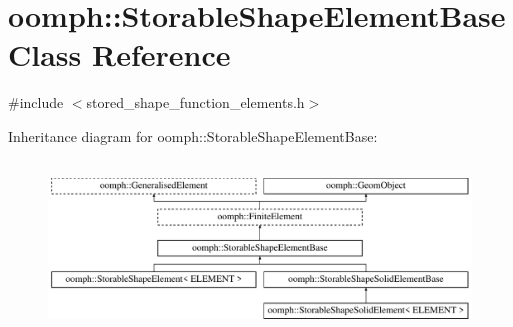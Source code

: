 \hypertarget{classoomph_1_1StorableShapeElementBase}{}\section{oomph\+:\+:Storable\+Shape\+Element\+Base Class Reference}
\label{classoomph_1_1StorableShapeElementBase}


{\ttfamily \#include $<$stored\+\_\+shape\+\_\+function\+\_\+elements.\+h$>$}

Inheritance diagram for oomph\+:\+:Storable\+Shape\+Element\+Base\+:\begin{figure}[H]
\begin{center}
\leavevmode
\includegraphics[height=4.666667cm]{classoomph_1_1StorableShapeElementBase}
\end{center}
\end{figure}
